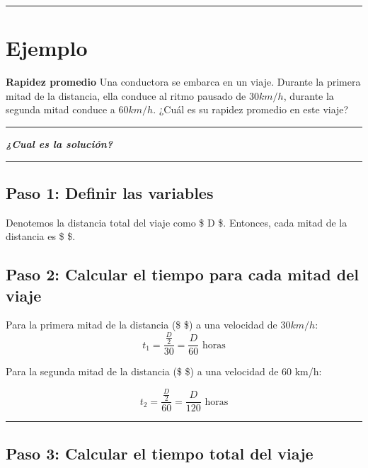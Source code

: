 \documentclass[
  letterpaper,
  DIV=11,
  numbers=noendperiod]{scrartcl}
\begin{document}
\begin{center}\rule{0.5\linewidth}{0.5pt}\end{center}

\section{Ejemplo}\label{ejemplo}

\textbf{Rapidez promedio} Una conductora se embarca en un viaje. Durante
la primera mitad de la distancia, ella conduce al ritmo pausado de
\(30 km/h\), durante la segunda mitad conduce a \(60 km/h\). ¿Cuál es su
rapidez promedio en este viaje?

\begin{center}\rule{0.5\linewidth}{0.5pt}\end{center}

\textbf{\emph{¿Cual es la solución?}}

\begin{center}\rule{0.5\linewidth}{0.5pt}\end{center}

\subsection{Paso 1: Definir las
variables}\label{paso-1-definir-las-variables}

Denotemos la distancia total del viaje como \$ D \$. Entonces, cada
mitad de la distancia es \$  \$.

\subsection{Paso 2: Calcular el tiempo para cada mitad del
viaje}\label{paso-2-calcular-el-tiempo-para-cada-mitad-del-viaje}

Para la primera mitad de la distancia (\$  \$) a una
velocidad de \(30 km/h\):
\[t_1 = \frac{\frac{D}{2}}{30} = \frac{D}{60} \text{ horas}\]

Para la segunda mitad de la distancia (\$  \$) a una
velocidad de 60 km/h:

\[t_2 = \frac{\frac{D}{2}}{60} = \frac{D}{120} \text{ horas}\]

\begin{center}\rule{0.5\linewidth}{0.5pt}\end{center}

\subsection{Paso 3: Calcular el tiempo total del
viaje}\label{paso-3-calcular-el-tiempo-total-del-viaje}
\end{document}
